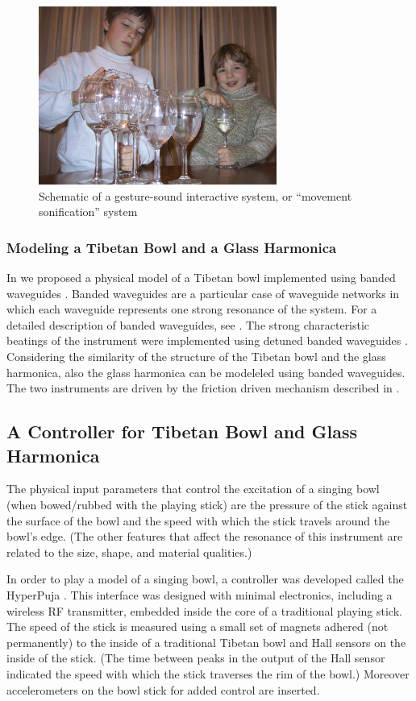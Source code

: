 \begin{figure}[t]
\centering
\includegraphics[width=7.8cm]{thomasfl.jpg}
\caption{Schematic of a gesture-sound interactive system, or ``movement sonification'' system}
  \label{Serafin:fig:2}
\end{figure}

\subsubsection{Modeling a Tibetan Bowl and a Glass Harmonica}

In \cite{Serafin:2002} we proposed a physical model of a Tibetan bowl implemented using banded waveguides  \cite{Essl:1999}. Banded waveguides are a particular case of waveguide networks in which each waveguide represents one strong resonance of the system. For a detailed description of banded waveguides, see \cite{Essl:2004}. The strong characteristic beatings of the instrument were implemented using detuned banded waveguides \cite{Serafin:2002a}. Considering the similarity of the structure of the Tibetan bowl and the glass harmonica, also the glass harmonica can be modeleled using banded waveguides. The two instruments are driven by the friction driven mechanism described in  \cite{Serafin:2004}.

\subsection{A Controller for Tibetan Bowl and Glass Harmonica}
The physical input parameters that control the excitation of a singing bowl (when bowed/rubbed with the playing stick) are the pressure of the stick against the surface of the bowl and the speed with which the stick travels around the bowl's edge. (The other features that affect the resonance of this instrument are related to the size, shape, and material qualities.)

In order to play a model of a singing bowl, a controller was developed called the HyperPuja  \cite{Young:2003a}. This interface was designed with minimal electronics, including a wireless RF transmitter, embedded inside the core of a traditional playing stick. The speed of the stick is measured using a small set of magnets adhered (not permanently) to the inside of a traditional Tibetan bowl and Hall sensors on the inside of the stick. (The time between peaks in the output of the Hall sensor indicated the speed with which the stick traverses the rim of the bowl.) Moreover accelerometers on the bowl stick for added control are inserted.

